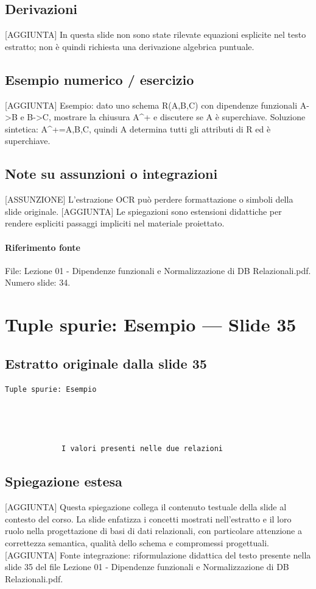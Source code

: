 \documentclass[11pt]{article}
\begin{document}
\subsection*{Derivazioni}
[AGGIUNTA] In questa slide non sono state rilevate equazioni esplicite nel testo estratto; non è quindi richiesta una derivazione algebrica puntuale.
\subsection*{Esempio numerico / esercizio}
[AGGIUNTA] Esempio: dato uno schema R(A,B,C) con dipendenze funzionali A->B e B->C, mostrare la chiusura A^+ e discutere se A è superchiave. Soluzione sintetica: A^+={A,B,C}, quindi A determina tutti gli attributi di R ed è superchiave.
\subsection*{Note su assunzioni o integrazioni}
[ASSUNZIONE] L'estrazione OCR può perdere formattazione o simboli della slide originale.
[AGGIUNTA] Le spiegazioni sono estensioni didattiche per rendere espliciti passaggi impliciti nel materiale proiettato.
\paragraph{Riferimento fonte} File: Lezione 01 - Dipendenze funzionali e Normalizzazione di DB Relazionali.pdf. Numero slide: 34.
\section{Tuple spurie: Esempio --- Slide 35}
\subsection*{Estratto originale dalla slide 35}
\begin{lstlisting}
Tuple spurie: Esempio




             I valori presenti nelle due relazioni
\end{lstlisting}
\subsection*{Spiegazione estesa}
[AGGIUNTA] Questa spiegazione collega il contenuto testuale della slide al contesto del corso. La slide enfatizza i concetti mostrati nell'estratto e il loro ruolo nella progettazione di basi di dati relazionali, con particolare attenzione a correttezza semantica, qualità dello schema e compromessi progettuali.
[AGGIUNTA] Fonte integrazione: riformulazione didattica del testo presente nella slide 35 del file Lezione 01 - Dipendenze funzionali e Normalizzazione di DB Relazionali.pdf.
\end{document}

